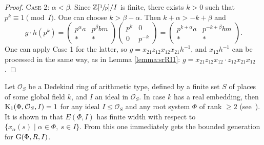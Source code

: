 \begin{proof}
\textsc{Case 2:} $\alpha<\beta$. Since $\mathbb{Z}[\sfrac{1}{p}]/I$ is finite, there exists $k>0$ such that $p^k\equiv 1\pmod I$. One can choose $k>\beta-\alpha$. Then $k+\alpha>-k+\beta$ and
\[ g\cdot h\left(p^k\right) =
\begin{pmatrix} p^\alpha a & p^\beta bm \\ * & * \end{pmatrix}
\begin{pmatrix} p^k & 0 \\ 0 & p^{-k} \end{pmatrix}=
\begin{pmatrix} p^{k+\alpha} a & p^{-k+\beta} bm \\ * & * \end{pmatrix}.
\]
One can apply Case 1 for the latter, so
$g=x_{21}z_{12}x_{12}x_{21}h^{-1}$,
and $x_{12}h^{-1}$ can be processed in the same way, as in Lemma \ref{lemma:srRI1}:
$g=x_{21}z_{12}x_{12}\cdot z_{12}x_{21}x_{12}$.
\end{proof}
Let $\mathcal{O}_S$ be a Dedekind ring of arithmetic type, defined by a finite set $S$ of places of some global field $k$, and $I$ an ideal in $\mathcal{O}_S$. In case $k$ has a real embedding, then $\operatorname{K}_1(\Phi,\mathcal{O}_S,I)=1$ for any ideal $I\trianglelefteq\mathcal{O}_S$ and any root system $\Phi$ of rank $\geqslant2$ (see~\cite{BassMilnorSerre}). It is shown in \cite{TavgenThesis} that $E(\Phi,I)$ has finite width with respect to $\{x_\alpha(s)\mid\alpha\in\Phi,\ s\in I\}$. From this one immediately gets the bounded generation for $\operatorname{G}(\Phi,R,I)$.

